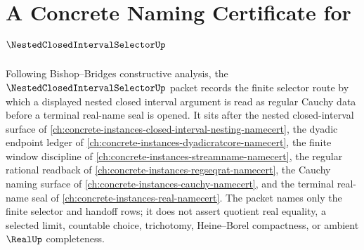 \chapter{A Concrete Naming Certificate for $\NestedClosedIntervalSelectorUp$}
\label{ch:concrete-instances-nested-closed-interval-selector-namecert}

Following Bishop--Bridges constructive analysis, the $\NestedClosedIntervalSelectorUp$ packet records the finite selector route by which a displayed nested closed interval argument is read as regular Cauchy data before a terminal real-name seal is opened. It sits after the nested closed-interval surface of \autoref{ch:concrete-instances-closed-interval-nesting-namecert}, the dyadic endpoint ledger of \autoref{ch:concrete-instances-dyadicratcore-namecert}, the finite window discipline of \autoref{ch:concrete-instances-streamname-namecert}, the regular rational readback of \autoref{ch:concrete-instances-regseqrat-namecert}, the Cauchy naming surface of \autoref{ch:concrete-instances-cauchy-namecert}, and the terminal real-name seal of \autoref{ch:concrete-instances-real-namecert}. The packet names only the finite selector and handoff rows; it does not assert quotient real equality, a selected limit, countable choice, trichotomy, Heine--Borel compactness, or ambient $\RealUp$ completeness.

